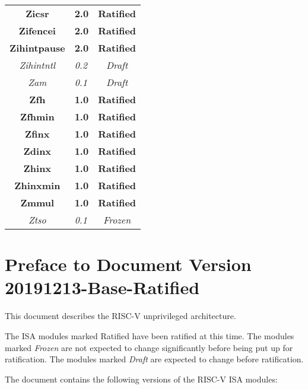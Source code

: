 {\begin{table}[hbt]
\begin{tabular}{|c|l|c|}
    \bf Zicsr      & \bf 2.0 & \bf Ratified \\
    \bf Zifencei   & \bf 2.0 & \bf Ratified \\
    \bf Zihintpause & \bf 2.0 & \bf Ratified \\
    \em Zihintntl   & \em 0.2 & \em Draft \\
    \em Zam        & \em 0.1 & \em Draft \\
    \bf Zfh        & \bf 1.0 & \bf Ratified \\
    \bf Zfhmin     & \bf 1.0 & \bf Ratified \\
    \bf Zfinx      & \bf 1.0 & \bf Ratified \\
    \bf Zdinx      & \bf 1.0 & \bf Ratified \\
    \bf Zhinx      & \bf 1.0 & \bf Ratified \\
    \bf Zhinxmin   & \bf 1.0 & \bf Ratified \\
    \bf Zmmul      & \bf 1.0 & \bf Ratified \\
    \em Ztso       & \em 0.1 & \em Frozen \\
    \hline
  \end{tabular}
\end{table}
}


\FloatBarrier

\section*{Preface to Document Version 20191213-Base-Ratified}

This document describes the RISC-V unprivileged architecture.

The ISA modules marked Ratified have been ratified at this time.  The modules
marked {\em Frozen} are not expected to change significantly before being put
up for ratification.  The modules marked {\em Draft} are expected to change
before ratification.

The document contains the following versions of the RISC-V ISA modules:

